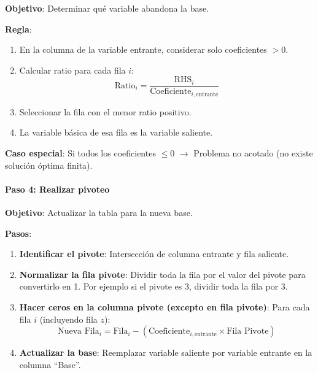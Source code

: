 \begin{tcolorbox}[title=Resumen del paso 3]
  \noindent \textbf{Objetivo}: Determinar qué variable abandona la base.
  
  \noindent \textbf{Regla}:
  \begin{enumerate}
    \item En la columna de la variable entrante, considerar solo coeficientes \(> 0\).
    \item Calcular ratio para cada fila \(i\):
     \[
     \text{Ratio}_i = \frac{\text{RHS}_i}{\text{Coeficiente}_{i,\text{entrante}}}
     \]
    \item Seleccionar la fila con el menor ratio positivo.
    \item La variable básica de esa fila es la variable saliente.
  \end{enumerate}
  
  \noindent \textbf{Caso especial}: Si todos los coeficientes \(\leq 0\) \(\rightarrow\) Problema no acotado (no existe solución óptima finita).
\end{tcolorbox}

\paragraph{Paso 4: Realizar pivoteo}

\begin{tcolorbox}[title=Resumen del paso 4]
  \noindent \textbf{Objetivo}: Actualizar la tabla para la nueva base.
  
  \noindent \textbf{Pasos}:
  \begin{enumerate}
    \item \textbf{Identificar el pivote}: Intersección de columna entrante y fila saliente.
    \item \textbf{Normalizar la fila pivote}: Dividir toda la fila por el valor del pivote para convertirlo en 1. Por ejemplo si el pivote es 3, dividir toda la fila por 3.
    \item \textbf{Hacer ceros en la columna pivote (excepto en fila pivote)}: Para cada fila \(i\) (incluyendo fila \(z\)):
       \[
       \text{Nueva Fila}_i = \text{Fila}_i - (\text{Coeficiente}_{i,\text{entrante}} \times \text{Fila Pivote})
       \]
    \item \textbf{Actualizar la base}: Reemplazar variable saliente por variable entrante en la columna ``Base''.
  \end{enumerate}
\end{tcolorbox}

